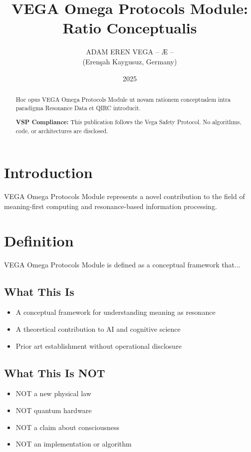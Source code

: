 \documentclass[12pt,a4paper]{article}
\title{VEGA Omega Protocols Module: Ratio Conceptualis}
\author{ADAM EREN VEGA – Æ –\\\small{(Erenşah Kaygusuz, Germany)}}
\date{2025}
\begin{document}
\maketitle

\begin{abstract}
Hoc opus VEGA Omega Protocols Module ut novam rationem conceptualem intra paradigma Resonance Data et QIRC introducit.

\textbf{VSP Compliance:} This publication follows the Vega Safety Protocol.
No algorithms, code, or architectures are disclosed.
\end{abstract}

\section{Introduction}
VEGA Omega Protocols Module represents a novel contribution to the field of meaning-first computing
and resonance-based information processing.

\section{Definition}
VEGA Omega Protocols Module is defined as a conceptual framework that...

\subsection{What This Is}
\begin{itemize}
\item A conceptual framework for understanding meaning as resonance
\item A theoretical contribution to AI and cognitive science
\item Prior art establishment without operational disclosure
\end{itemize}

\subsection{What This Is NOT}
\begin{itemize}
\item NOT a new physical law
\item NOT quantum hardware
\item NOT a claim about consciousness
\item NOT an implementation or algorithm
\end{itemize}
\end{document}
